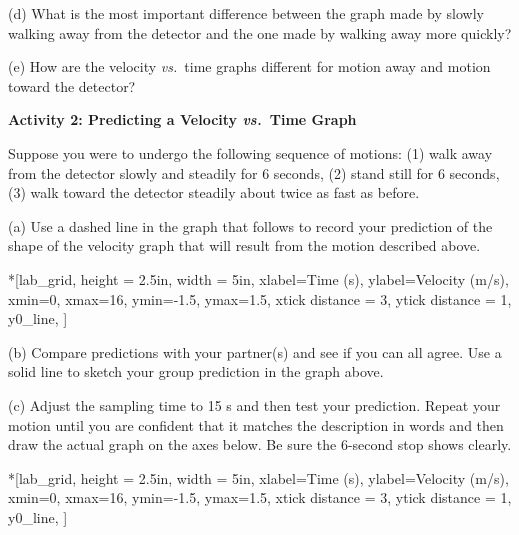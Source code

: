 (d) What is the most important difference between the graph made by slowly walking
away from the detector and the one made by walking away more quickly? 
\answerspace{25mm}

(e) How are the velocity \textit{vs.}~time graphs different for motion away and motion
toward the detector?
\answerspace{25mm}

\pagebreak[2]
\textbf{Activity 2: Predicting a Velocity \textit{vs.}~Time Graph }

Suppose you were to undergo the following sequence of motions: (1) walk away
from the detector slowly and steadily for 6 seconds, (2) stand still for 6 seconds,
(3) walk toward the detector steadily about twice as fast as before.

(a) Use a dashed line in the graph that follows to record your prediction of
the shape of the velocity graph that will result from the motion described above.

\begin{lab_axis}*[lab_grid,
	height = {2.5in}, width = {5in},
	xlabel={Time (s)},
	ylabel={Velocity (m/s)},
	xmin=0, xmax=16,
	ymin=-1.5, ymax=1.5,
	xtick distance = 3,
	ytick distance = 1,
	y0_line,
	]
\end{lab_axis}

(b) Compare predictions with your partner(s) and see if you can all agree. Use
a solid line to sketch your group prediction in the graph above.

(c) Adjust the sampling time to 15 s and then test your prediction. Repeat your
motion until you are confident that it matches the description in words and
then draw the actual graph on the axes below. Be sure the 6-second stop shows
clearly.

\begin{lab_axis}*[lab_grid,
	height = {2.5in}, width = {5in},
	xlabel={Time (s)},
	ylabel={Velocity (m/s)},
	xmin=0, xmax=16,
	ymin=-1.5, ymax=1.5,
	xtick distance = 3,
	ytick distance = 1,
	y0_line,
	]
\end{lab_axis}

